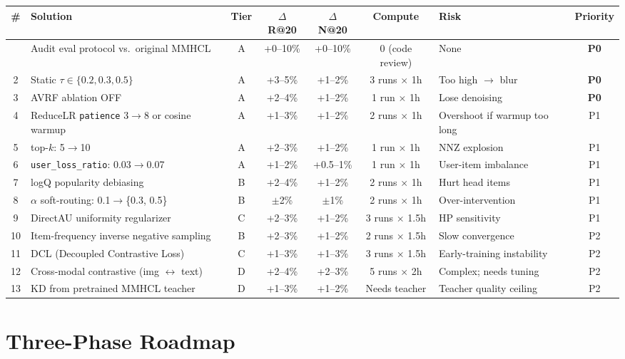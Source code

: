 \documentclass[11pt,a4paper]{article}
\begin{document}
\begin{longtable}{|c|p{5.2cm}|c|c|c|c|p{2cm}|c|}
\hline
\textbf{\#} & \textbf{Solution} & \textbf{Tier} & \textbf{$\Delta$ R@20} & \textbf{$\Delta$ N@20} & \textbf{Compute} & \textbf{Risk} & \textbf{Priority} \\
\hline
\endhead
\hline
\endfoot
1 & Audit eval protocol vs.\ original MMHCL & A & +0--10\% & +0--10\% & 0 (code review) & None & \textbf{P0} \\
\hline
2 & Static $\tau \in \{0.2, 0.3, 0.5\}$ & A & +3--5\% & +1--2\% & 3 runs $\times$ 1h & Too high $\to$ blur & \textbf{P0} \\
\hline
3 & AVRF ablation OFF & A & +2--4\% & +1--2\% & 1 run $\times$ 1h & Lose denoising & \textbf{P0} \\
\hline
4 & ReduceLR \texttt{patience} 3$\to$8 or cosine warmup & A & +1--3\% & +1--2\% & 2 runs $\times$ 1h & Overshoot if warmup too long & P1 \\
\hline
5 & top-$k$: 5$\to$10 & A & +2--3\% & +1--2\% & 1 run $\times$ 1h & NNZ explosion & P1 \\
\hline
6 & \texttt{user\_loss\_ratio}: 0.03$\to$0.07 & A & +1--2\% & +0.5--1\% & 1 run $\times$ 1h & User-item imbalance & P1 \\
\hline
7 & logQ popularity debiasing & B & +2--4\% & +1--2\% & 2 runs $\times$ 1h & Hurt head items & P1 \\
\hline
8 & $\alpha$ soft-routing: 0.1$\to$\{0.3, 0.5\} & B & $\pm$2\% & $\pm$1\% & 2 runs $\times$ 1h & Over-intervention & P1 \\
\hline
9 & DirectAU uniformity regularizer & C & +2--3\% & +1--2\% & 3 runs $\times$ 1.5h & HP sensitivity & P1 \\
\hline
10 & Item-frequency inverse negative sampling & B & +2--3\% & +1--2\% & 2 runs $\times$ 1.5h & Slow convergence & P2 \\
\hline
11 & DCL (Decoupled Contrastive Loss) & C & +1--3\% & +1--3\% & 3 runs $\times$ 1.5h & Early-training instability & P2 \\
\hline
12 & Cross-modal contrastive (img $\leftrightarrow$ text) & D & +2--4\% & +2--3\% & 5 runs $\times$ 2h & Complex; needs tuning & P2 \\
\hline
13 & KD from pretrained MMHCL teacher & D & +1--3\% & +1--2\% & Needs teacher & Teacher quality ceiling & P2 \\
\hline
\end{longtable}

\section{Three-Phase Roadmap}
\end{document}
